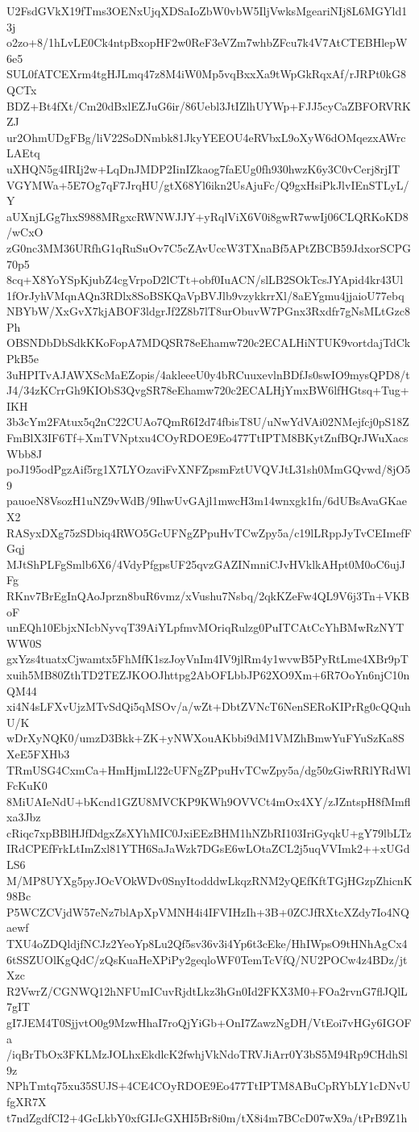 U2FsdGVkX19fTms3OENxUjqXDSaIoZbW0vbW5IljVwksMgeariNIj8L6MGYld13j
o2zo+8/1hLvLE0Ck4ntpBxopHF2w0ReF3eVZm7whbZFcu7k4V7AtCTEBHlepW6e5
SUL0fATCEXrm4tgHJLmq47z8M4iW0Mp5vqBxxXa9tWpGkRqxAf/rJRPt0kG8QCTx
BDZ+Bt4fXt/Cm20dBxlEZJuG6ir/86Uebl3JtIZlhUYWp+FJJ5cyCaZBFORVRKZJ
ur2OhmUDgFBg/liV22SoDNmbk81JkyYEEOU4eRVbxL9oXyW6dOMqezxAWrcLAEtq
uXHQN5g4IRIj2w+LqDnJMDP2IinIZkaog7faEUg0fh930hwzK6y3C0vCerj8rjIT
VGYMWa+5E7Og7qF7JrqHU/gtX68Yl6ikn2UsAjuFc/Q9gxHsiPkJlvIEnSTLyL/Y
aUXnjLGg7hxS988MRgxcRWNWJJY+yRqlViX6V0i8gwR7wwIj06CLQRKoKD8/wCxO
zG0nc3MM36URfhG1qRuSuOv7C5cZAvUccW3TXnaBf5APtZBCB59JdxorSCPG70p5
8cq+X8YoYSpKjubZ4cgVrpoD2lCTt+obf0IuACN/slLB2SOkTcsJYApid4kr43Ul
1fOrJyhVMqnAQn3RDlx8SoBSKQaVpBVJlb9vzykkrrXl/8aEYgmu4jjaioU77ebq
NBYbW/XxGvX7kjABOF3ldgrJf2Z8b7lT8urObuvW7PGnx3Rxdfr7gNsMLtGzc8Ph
OBSNDbDbSdkKKoFopA7MDQSR78eEhamw720c2ECALHiNTUK9vortdajTdCkPkB5e
3uHPITvAJAWXScMaEZopis/4akleeeU0y4bRCuuxevlnBDfJs0swIO9mysQPD8/t
J4/34zKCrrGh9KIObS3QvgSR78eEhamw720c2ECALHjYmxBW6lfHGtsq+Tug+IKH
3b3cYm2FAtux5q2nC22CUAo7QmR6I2d74fbisT8U/uNwYdVAi02NMejfcj0pS18Z
FmBlX3IF6Tf+XmTVNptxu4COyRDOE9Eo477TtIPTM8BKytZnfBQrJWuXacsWbb8J
poJ195odPgzAif5rg1X7LYOzaviFvXNFZpsmFztUVQVJtL31sh0MmGQvwd/8jO59
pauoeN8VsozH1uNZ9vWdB/9IhwUvGAjl1mwcH3m14wnxgk1fn/6dUBsAvaGKaeX2
RASyxDXg75zSDbiq4RWO5GcUFNgZPpuHvTCwZpy5a/c19lLRppJyTvCEImefFGqj
MJtShPLFgSmlb6X6/4VdyPfgpsUF25qvzGAZINmniCJvHVklkAHpt0M0oC6ujJFg
RKnv7BrEgInQAoJprzn8buR6vmz/xVushu7Nsbq/2qkKZeFw4QL9V6j3Tn+VKBoF
unEQh10EbjxNIcbNyvqT39AiYLpfmvMOriqRulzg0PuITCAtCcYhBMwRzNYTWW0S
gxYzs4tuatxCjwamtx5FhMfK1szJoyVnIm4IV9jlRm4y1wvwB5PyRtLme4XBr9pT
xuih5MB80ZthTD2TEZJKOOJhttpg2AbOFLbbJP62XO9Xm+6R7OoYn6njC10nQM44
xi4N4sLFXvUjzMTvSdQi5qMSOv/a/wZt+DbtZVNcT6NenSERoKIPrRg0cQQuhU/K
wDrXyNQK0/umzD3Bkk+ZK+yNWXouAKbbi9dM1VMZhBmwYuFYuSzKa8SXeE5FXHb3
TRmUSG4CxmCa+HmHjmLl22cUFNgZPpuHvTCwZpy5a/dg50zGiwRRlYRdWlFcKuK0
8MiUAIeNdU+bKcnd1GZU8MVCKP9KWh9OVVCt4mOx4XY/zJZntspH8fMmflxa3Jbz
cRiqc7xpBBlHJfDdgxZsXYhMIC0JxiEEzBHM1hNZbRI103IriGyqkU+gY79lbLTz
IRdCPEfFrkLtImZxl81YTH6SaJaWzk7DGsE6wLOtaZCL2j5uqVVImk2++xUGdLS6
M/MP8UYXg5pyJOcVOkWDv0SnyItodddwLkqzRNM2yQEfKftTGjHGzpZhicnK98Bc
P5WCZCVjdW57eNz7blApXpVMNH4i4IFVIHzIh+3B+0ZCJfRXtcXZdy7Io4NQaewf
TXU4oZDQldjfNCJz2YeoYp8Lu2Qf5sv36v3i4Yp6t3cEke/HhIWpsO9tHNhAgCx4
6tSSZUOlKgQdC/zQsKuaHeXPiPy2geqloWF0TemTcVfQ/NU2POCw4z4BDz/jtXzc
R2VwrZ/CGNWQ12hNFUmICuvRjdtLkz3hGn0Id2FKX3M0+FOa2rvnG7flJQlL7gIT
gI7JEM4T0SjjvtO0g9MzwHhaI7roQjYiGb+OnI7ZawzNgDH/VtEoi7vHGy6IGOFa
/iqBrTbOx3FKLMzJOLhxEkdlcK2fwhjVkNdoTRVJiArr0Y3bS5M94Rp9CHdhSl9z
NPhTmtq75xu35SUJS+4CE4COyRDOE9Eo477TtIPTM8ABuCpRYbLY1cDNvUfgXR7X
t7ndZgdfCI2+4GcLkbY0xfGIJcGXHI5Br8i0m/tX8i4m7BCcD07wX9a/tPrB9Z1h
